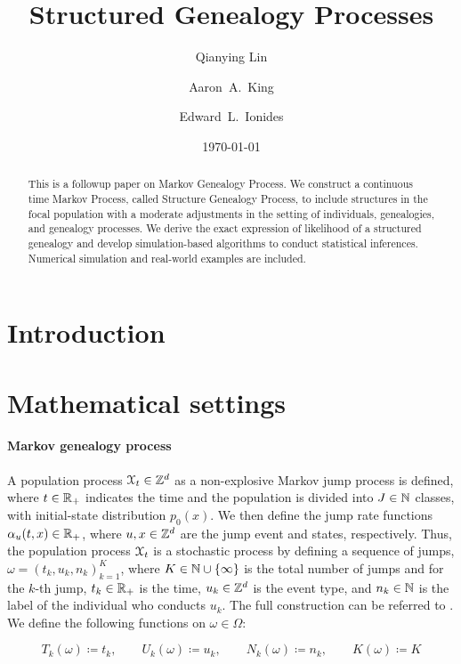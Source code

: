 \documentclass[11pt,reqno,final]{amsart}\usepackage[]{graphicx}\usepackage[]{color}
\title{Structured Genealogy Processes}
\author[Lin]{Qianying Lin}
\author[King]{Aaron~A.~King}
\author[Ionides]{Edward~L.~Ionides}
\date{\today}
\begin{document}
\maketitle

\begin{abstract}
  This is a followup paper on Markov Genealogy Process. We construct a continuous time Markov Process, called Structure Genealogy Process, to include structures in the focal population with a moderate adjustments in the setting of individuals, genealogies, and genealogy processes. We derive the exact expression of likelihood of a structured genealogy and develop simulation-based algorithms to conduct statistical inferences. Numerical simulation and real-world examples are included.
\end{abstract}

\section{Introduction}

\section{Mathematical settings}
\label{sec:settings}
\paragraph{Markov genealogy process}
A population process $\mathcal{X}_t\in\mathbb{Z}^d$ as a non-explosive Markov jump process is defined, where $t\in\mathbb{R}_{+}$ indicates the time and the population is divided into $J\in\mathbb{N}$ classes, with initial-state distribution $p_0(x)$. We then define the jump rate functions $\alpha_u(t,x)\in\mathbb{R}_{+}$, where $u, x\in\mathbb{Z}^d$ are the jump event and states, respectively. Thus, the population process $\mathcal{X}_t$ is a stochastic process by defining a sequence of jumps, $\omega=\left(t_k, u_k, n_k\right)_{k=1}^K$, where $K\in\mathbb{N}\cup\{\infty\}$ is the total number of jumps and for the $k$-th jump, $t_k\in\mathbb{R}_{+}$ is the time, $u_k\in\mathbb{Z}^d$ is the event type, and $n_{k}\in\mathbb{N}$ is the label of the individual who conducts $u_k$. The full construction can be referred to \citet{King2021}. We define the following functions on $\omega\in\Omega$:

\begin{equation}
  T_k(\omega)\coloneqq t_k,\qquad U_k(\omega)\coloneqq u_k,\qquad N_k(\omega)\coloneqq n_k,\qquad K(\omega)\coloneqq K
\end{equation}
\end{document}
